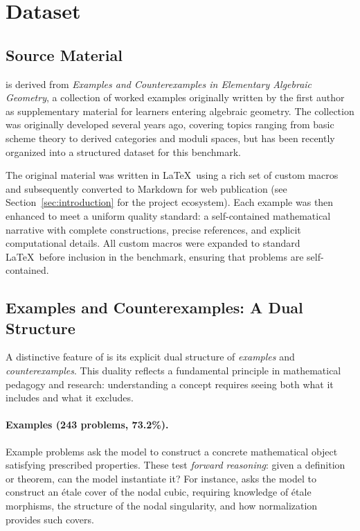\section{Dataset}
\label{sec:dataset}

\subsection{Source Material}

\ecagbench{} is derived from \emph{Examples and Counterexamples in Elementary Algebraic Geometry}, a collection of worked examples originally written by the first author as supplementary material for learners entering algebraic geometry.
The collection was originally developed several years ago, covering topics ranging from basic scheme theory to derived categories and moduli spaces, but has been recently organized into a structured dataset for this benchmark.

The original material was written in \LaTeX\ using a rich set of custom macros and subsequently converted to Markdown for web publication (see Section~\ref{sec:introduction} for the project ecosystem).
Each example was then enhanced to meet a uniform quality standard: a self-contained mathematical narrative with complete constructions, precise references, and explicit computational details.
All custom macros were expanded to standard \LaTeX\ before inclusion in the benchmark, ensuring that problems are self-contained.

\subsection{Examples and Counterexamples: A Dual Structure}
\label{sec:dual-structure}

A distinctive feature of \ecagbench{} is its explicit dual structure of \emph{examples} and \emph{counterexamples}.
This duality reflects a fundamental principle in mathematical pedagogy and research: understanding a concept requires seeing both what it includes and what it excludes.

\paragraph{Examples (243 problems, 73.2\%).}
Example problems ask the model to construct a concrete mathematical object satisfying prescribed properties.
These test \emph{forward reasoning}: given a definition or theorem, can the model instantiate it?
For instance,  asks the model to construct an \'etale cover of the nodal cubic, requiring knowledge of \'etale morphisms, the structure of the nodal singularity, and how normalization provides such covers.

